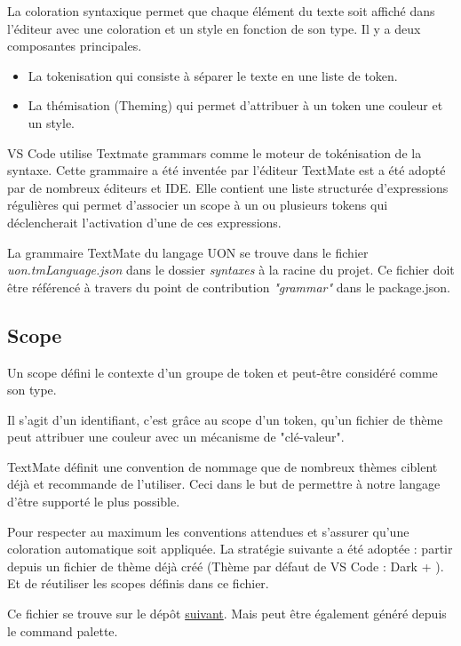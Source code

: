 \documentclass[
    iict, %
    il, %
]{heig-tb}
\begin{document}
La coloration syntaxique permet que chaque élément du texte soit affiché dans l'éditeur avec une coloration et un style en fonction de son type.
Il y a deux composantes principales.
\begin{itemize}
    \item La tokenisation qui consiste à séparer le texte en une liste de token.
    \item La thémisation (Theming) qui permet d'attribuer à un token une couleur et un style.
\end{itemize}

VS Code utilise Textmate grammars comme le moteur de tokénisation de la syntaxe.
Cette grammaire a été inventée par l'éditeur TextMate est a été adopté par de nombreux éditeurs et IDE.
Elle contient une liste structurée d'expressions régulières qui permet d'associer un scope
à un ou plusieurs tokens qui déclencherait l'activation d'une de ces expressions. \cite{syntax-highlight-guide}

La grammaire TextMate du langage UON se trouve dans le fichier \emph{uon.tmLanguage.json} dans le dossier \emph{syntaxes} à la racine du projet.
Ce fichier doit être référencé à travers du point de contribution \emph{"grammar"} dans le package.json.

\subsection{Scope}
Un scope défini le contexte d'un groupe de token et peut-être considéré comme son type.

Il s'agit d'un identifiant, c'est grâce au scope d'un token, qu'un fichier de thème peut attribuer une couleur avec un mécanisme de "clé-valeur".

TextMate définit une convention de nommage que de nombreux thèmes ciblent déjà et recommande de l'utiliser.
Ceci dans le but de permettre à notre langage d'être supporté le plus possible. \cite{textmate-grammars}

Pour respecter au maximum les conventions attendues et s'assurer qu'une coloration automatique soit appliquée.
La stratégie suivante a été adoptée : partir depuis un fichier de thème déjà créé (Thème par défaut de VS Code : Dark + ).
Et de réutiliser les scopes définis dans ce fichier.

Ce fichier se trouve sur le dépôt \href{https://github.com/microsoft/vscode/blob/main/extensions/theme-defaults/themes/dark_vs.json}{suivant}.
Mais peut être également généré depuis le command palette.
\end{document}
